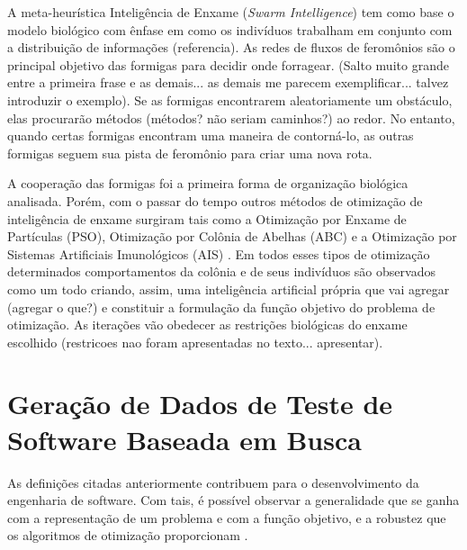 A meta-heurística Inteligência de Enxame (\textit{Swarm Intelligence}) tem como base o modelo biológico com ênfase em como os indivíduos trabalham em conjunto com a distribuição de informações (referencia). As redes de fluxos de feromônios são o principal objetivo das formigas para decidir onde forragear. (Salto muito grande entre a primeira frase e as demais... as demais me parecem exemplificar...  talvez introduzir o exemplo). Se as formigas encontrarem aleatoriamente um obstáculo, elas procurarão métodos (métodos? não seriam caminhos?) ao redor. No entanto, quando certas formigas encontram uma maneira de contorná-lo, as outras formigas seguem sua pista de feromônio para criar uma nova rota.

A cooperação das formigas foi a primeira forma de organização biológica analisada. Porém, com o passar do tempo  outros métodos de otimização de inteligência de enxame surgiram tais como a Otimização por Enxame de Partículas (PSO), Otimização por Colônia de Abelhas (ABC) e a Otimização por Sistemas Artificiais Imunológicos (AIS) \cite{blum2008swarm}. Em todos esses tipos de otimização determinados comportamentos da colônia e de seus indivíduos são observados como um todo criando, assim, uma inteligência artificial própria que vai agregar (agregar o que?) e constituir a formulação da função objetivo do problema de otimização. As iterações vão obedecer as restrições biológicas do enxame escolhido (restricoes nao foram apresentadas no texto... apresentar).

\section{Geração de Dados de Teste de Software Baseada em Busca \label{sec:trabsSBST}}

As definições citadas anteriormente contribuem para o desenvolvimento da engenharia de software. Com tais, é possível observar a generalidade que se ganha com a representação de um problema e com a função objetivo, e a robustez que os algoritmos de otimização proporcionam \cite{harman2012search}. 


